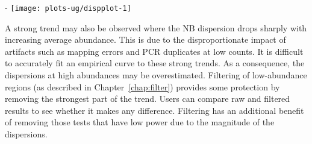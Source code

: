 \documentclass{report}\usepackage[]{graphicx}\usepackage[usenames,dvipsnames]{color}
\makeatletter
\def\maxwidth{ %
  \ifdim\Gin@nat@width>\linewidth
    \linewidth
  \else
    \Gin@nat@width
  \fi
}
\newcommand{\hlnum}[1]{\textcolor[rgb]{0.816,0.125,0.439}{#1}}%
\newcommand{\hlstr}[1]{\textcolor[rgb]{0.251,0.627,0.251}{#1}}%
\newcommand{\hlopt}[1]{\textcolor[rgb]{0,0,0}{#1}}%
\newcommand{\hlstd}[1]{\textcolor[rgb]{0.251,0.251,0.251}{#1}}%
\newcommand{\hlkwb}[1]{\textcolor[rgb]{0,0,0}{#1}}%
\newcommand{\hlkwc}[1]{\textcolor[rgb]{0.251,0.251,0.251}{#1}}%
\newcommand{\hlkwd}[1]{\textcolor[rgb]{0.878,0.439,0.125}{#1}}%
\newenvironment{knitrout}{}{} %
\makeatother
\begin{document}
\begin{knitrout}
\color{fgcolor}\begin{adjustwidth}{0mm}{-\fltoffset}
\texttt{[image: plots-ug/dispplot-1]} \end{adjustwidth}
\end{knitrout}

A strong trend may also be observed where the NB dispersion drops sharply with increasing average abundance.
This is due to the disproportionate impact of artifacts such as mapping errors and PCR duplicates at low counts. 
It is difficult to accurately fit an empirical curve to these strong trends.  
As a consequence, the dispersions at high abundances may be overestimated. 
Filtering of low-abundance regions (as described in Chapter~\ref{chap:filter}) provides some protection by removing the strongest part of the trend.
Users can compare raw and filtered results to see whether it makes any difference.
Filtering has an additional benefit of removing those tests that have low power due to the magnitude of the dispersions.
\end{document}
